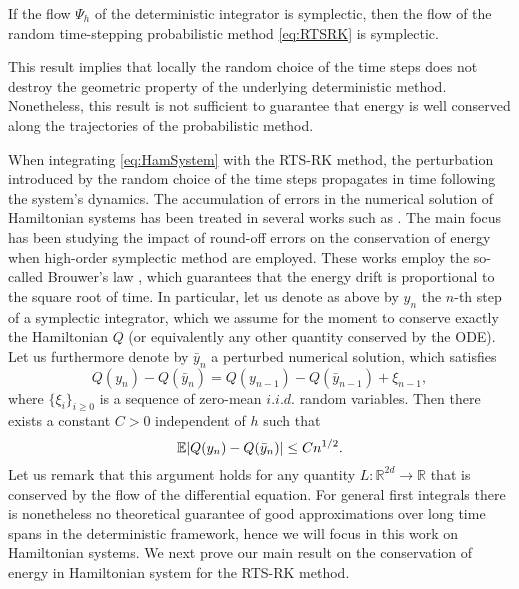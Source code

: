 \documentclass{siamart1116}
\numberwithin{theorem}{section}
\DeclarePairedDelimiter{\abs}{\lvert}{\rvert}
\newcommand{\R}{\mathbb{R}}
\newcommand{\E}{\operatorname{\mathbb{E}}}
\begin{document}
\begin{lemma}\label{lem:SympRTSRK} If the flow $\Psi_h$ of the deterministic integrator is symplectic, then the flow of the random time-stepping probabilistic method \eqref{eq:RTSRK} is symplectic.
\end{lemma}
This result implies that locally the random choice of the time steps does not destroy the geometric property of the underlying deterministic method. Nonetheless, this result is not sufficient to guarantee that energy is well conserved along the trajectories of the probabilistic method.

When integrating \eqref{eq:HamSystem} with the RTS-RK method, the perturbation introduced by the random choice of the time steps propagates in time following the system's dynamics. The accumulation of errors in the numerical solution of Hamiltonian systems has been treated in several works such as \cite{HMR08, Vil08b}. The main focus has been studying the impact of round-off errors on the conservation of energy when high-order symplectic method are employed. These works employ the so-called Brouwer's law \cite{Bro37}, which guarantees that the energy drift is proportional to the square root of time. In particular, let us denote as above by $y_n$ the $n$-th step of a symplectic integrator, which we assume for the moment to conserve exactly the Hamiltonian $Q$ (or equivalently any other quantity conserved by the ODE). Let us furthermore denote by $\bar y_n$ a perturbed numerical solution, which satisfies
\begin{equation}
	Q(y_n) - Q(\bar y_n) = Q(y_{n-1}) - Q(\bar y_{n-1}) + \xi_{n-1},
\end{equation}
where $\{\xi_i\}_{i\geq 0}$ is a sequence of zero-mean $i.i.d.$ random variables. Then there exists a constant $C > 0$ independent of $h$ such that
\begin{equation}\label{eq:Brower}
	\E\abs{Q(y_n) - Q(\bar y_n)} \leq C n^{1/2}.
\end{equation}
Let us remark that this argument holds for any quantity $L \colon \R^{2d} \to \R$ that is conserved by the flow of the differential equation. For general first integrals there is nonetheless no theoretical guarantee of good approximations over long time spans in the deterministic framework, hence we will focus in this work on Hamiltonian systems. We next prove our main result on the conservation of energy in Hamiltonian system for the RTS-RK method.
\end{document}
